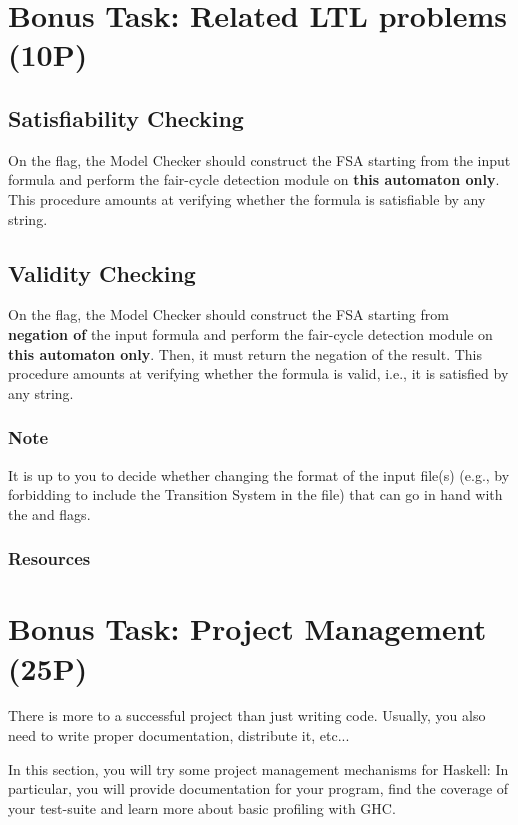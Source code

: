 \documentclass{article}
\begin{document}
\section{Bonus Task: Related LTL problems (10P)}

\subsection{Satisfiability Checking}
On the  flag, the Model Checker should construct the FSA starting from the input formula
and perform the fair-cycle detection module on \textbf{this automaton only}. 
This procedure amounts at verifying whether the formula is satisfiable by any string. 

\subsection{Validity Checking}
On the  flag, the Model Checker should construct the FSA starting from \textbf{negation of} 
the input formula and perform the fair-cycle detection module on \textbf{this automaton only}. 
Then, it must return the negation of the result.
This procedure amounts at verifying whether the formula is valid, i.e., it is satisfied by any string. 

\subsubsection*{Note}
It is up to you to decide whether changing the format of the input file(s)
(e.g., by forbidding to include the Transition System in the file) 
that can go in hand with the  and  flags.

\subsubsection*{Resources}
\cite[Paragraph 5.2.2]{BaKa}


\section{Bonus Task: Project Management (25P)}

There is more to a successful project than just writing code. 
Usually, you also need to write proper documentation, distribute it, etc...

In this section, you will try some project management mechanisms for Haskell: 
In particular, you will provide documentation for your program, 
find the coverage of your test-suite and learn more about basic profiling with GHC.
\end{document}
